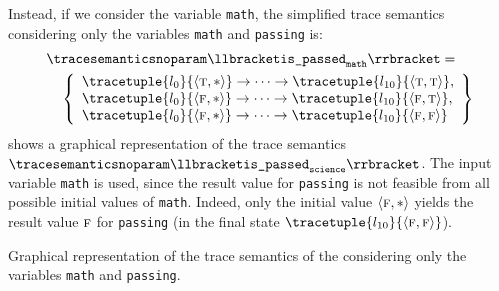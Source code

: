 \begin{example}
Instead, if we consider the variable \texttt{math}, the simplified trace semantics considering only the variables \texttt{math} and \texttt{passing} is:
\begin{align*}
  &{\tracesemanticsnoparam\semanticsof{\texttt{is\_passed}_\texttt{math}}
  =}\\
  &\quad\left\{
    \begin{array}{l}
    \tracetuple{\locinit}{\tuple\true\anyvalue}\tracearrow\tracetuple{\loc{10}}{\tuple\true\true}, \\
    \tracetuple{\locinit}{\tuple\false\anyvalue}\tracearrow\tracetuple{\loc{10}}{\tuple\false\true}, \\
    \tracetuple{\locinit}{\tuple\false\anyvalue}\tracearrow\tracetuple{\loc{10}}{\tuple\false\false}
  \end{array}
  \right\}
\end{align*}
 shows a graphical representation of the trace semantics $\tracesemanticsnoparam\semanticsof{\texttt{is\_passed}_\texttt{science}}$.
The input variable \texttt{math} is used, since the result value for \texttt{passing} is not feasible from all possible initial values of \texttt{math}.
Indeed, only the initial value $\langle \textsc{f}, {*} \rangle$ yields the result value $\textsc{f}$ for \texttt{passing} (in the final state $\tracetuple{\loc{10}}{\tuple\false\false}$).
\end{example}


\begin{marginfigure}[*-11]
\caption{Graphical representation of the trace semantics of the  considering only the variables \texttt{math} and \texttt{passing}.}
\end{marginfigure}

